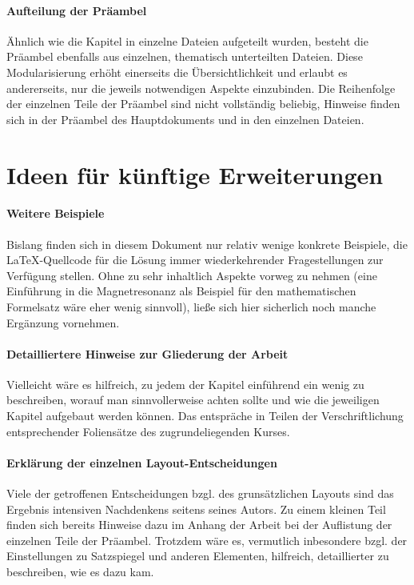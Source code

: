 \paragraph{Aufteilung der Präambel}

Ähnlich wie die Kapitel in einzelne Dateien aufgeteilt wurden, besteht die Präambel ebenfalls aus einzelnen, thematisch unterteilten Dateien. Diese Modularisierung erhöht einerseits die Übersichtlichkeit und erlaubt es andererseits, nur die jeweils notwendigen Aspekte einzubinden. Die Reihenfolge der einzelnen Teile der Präambel sind nicht vollständig beliebig, Hinweise finden sich in der Präambel des Hauptdokuments und in den einzelnen Dateien.



\section{Ideen für künftige Erweiterungen}

\paragraph{Weitere Beispiele}

Bislang finden sich in diesem Dokument nur relativ wenige konkrete Beispiele, die \LaTeX{}-Quellcode für die Lösung immer wiederkehrender Fragestellungen zur Verfügung stellen. Ohne zu sehr inhaltlich Aspekte vorweg zu nehmen (eine Einführung in die Magnetresonanz als Beispiel für den mathematischen Formelsatz wäre eher wenig sinnvoll), ließe sich hier sicherlich noch manche Ergänzung vornehmen.


\paragraph{Detailliertere Hinweise zur Gliederung der Arbeit}

Vielleicht wäre es hilfreich, zu jedem der Kapitel einführend ein wenig zu beschreiben, worauf man sinnvollerweise achten sollte und wie die jeweiligen Kapitel aufgebaut werden können. Das entspräche in Teilen der Verschriftlichung entsprechender Foliensätze des zugrundeliegenden Kurses.


\paragraph{Erklärung der einzelnen Layout-Entscheidungen}

Viele der getroffenen Entscheidungen bzgl. des grunsätzlichen Layouts sind das Ergebnis intensiven Nachdenkens seitens seines Autors. Zu einem kleinen Teil finden sich bereits Hinweise dazu im Anhang der Arbeit bei der Auflistung der einzelnen Teile der Präambel. Trotzdem wäre es, vermutlich inbesondere bzgl. der Einstellungen zu Satzspiegel und anderen Elementen, hilfreich, detaillierter zu beschreiben, wie es dazu kam.


